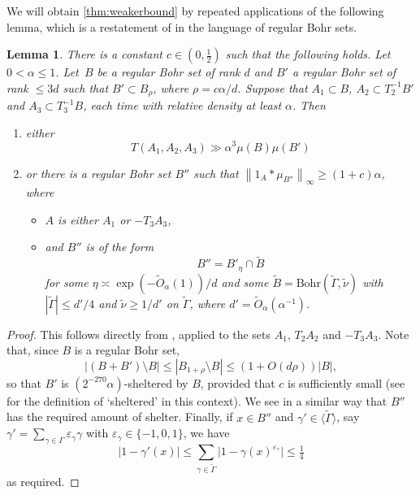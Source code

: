 \documentclass{daj}
\newtheorem{lemma}[theorem]{Lemma}
\theoremstyle{definition}
\newcommand{\eps}{\varepsilon}
\newcommand{\m}[1]{\mu_{#1}}
\newcommand{\norm}[1]{\left\|#1\right\|}
\begin{document}
We will obtain \cref{thm:weakerbound} by repeated applications of the following lemma, which is a restatement of \cite[Corollary~3.7]{Bloomthesis} in the language of regular Bohr sets.

\begin{lemma}
\label{cor:thesis}
There is a constant $c\in (0, \tfrac12)$ such that the following holds. Let $0< \alpha\leq 1$. Let~$B$ be a regular Bohr set of rank $d$ and $B'$ a regular Bohr set of rank $\leq 3d$ such that $B' \subset B_{\rho}$, where $\rho = c \alpha/d$. Suppose that $A_1 \subset B$, $A_2\subset T_2^{-1}B'$ and $A_3\subset T_3^{-1}B$, each time with relative density at least $\alpha$. Then 
\begin{enumerate}
	\item either 
\begin{equation*}
T(A_1, A_2, A_3) \gg \alpha^3 \mu(B) \mu(B')
\end{equation*}
	\item or there is a regular Bohr set $B''$ such that $\norm{1_A * \m{B''}}_{\infty} \geq (1+c)\alpha$, where 
	\begin{itemize}
		\item $A$ is either $A_1$ or $-T_3A_3$,
		\item and $B''$ is of the form 
		\begin{equation*}
			B'' = B'_{\eta} \cap \widetilde{B}
		\end{equation*}
		for some $\eta \asymp \exp(-\tilde{O}_{\alpha}(1))/d$ and some $\widetilde{B} = \mathrm{Bohr}(\widetilde{\Gamma}, \widetilde{\nu})$ with $|\widetilde{\Gamma}| \leq d'/4$ and $\widetilde{\nu} \geq 1/d'$ on $\widetilde{\Gamma}$, where $d' = \tilde{O}_{\alpha}(\alpha^{-1})$.
	\end{itemize}
\end{enumerate}
\end{lemma}


\begin{proof}
This follows directly from \cite[Corollary 3.7]{Bloomthesis}, applied to the sets $A_1$, $T_2A_2$ and $-T_3A_3$. Note that, since $B$ is a regular Bohr set,
\begin{equation*}
|(B+B')\setminus B| \leq |B_{1+\rho} \setminus B| \leq (1+O(d\rho)) |B|,
\end{equation*}
so that $B'$ is $(2^{-270}\alpha)$-sheltered by $B$, provided that $c$ is sufficiently small (see \cite{Bloomthesis} for the definition of `sheltered' in this context). We see in a similar way that $B''$ has the required amount of shelter. Finally, if $x\in B''$ and $\gamma' \in \langle \widetilde{\Gamma}\rangle$, say $\gamma' = \sum_{\gamma\in \Gamma} \eps_{\gamma}\gamma$ with $ \eps_{\gamma}\in \{-1, 0, 1\}$, we have 
\begin{equation*}
\lvert 1-\gamma'(x)\rvert \leq \sum_{\gamma\in \widetilde{\Gamma}} \lvert 1-\gamma(x)^{\eps_\gamma}\rvert \leq \tfrac14
\end{equation*} 
as required.
\end{proof}
\end{document}
